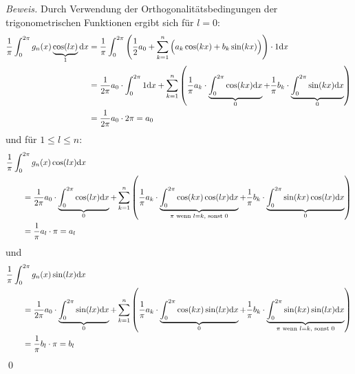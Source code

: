 \textit{Beweis.} Durch Verwendung der Orthogonalitätsbedingungen der trigonometrischen Funktionen
%
ergibt sich für $l=0$:
%
\begin{align*}
  \dfrac{1}{\pi} \int_{0}^{2\pi} g_n(x)\underbrace{\cos(lx)}_{1} \text{d} x 
  &= \dfrac{1}{\pi} \int_{0}^{2\pi} \left(\dfrac{1}{2}a_0 + \sum_{k=1}^{n}\Big(a_k\cos(kx)+b_k\sin(kx)\Big)\right)\cdot 1 \text{d} x \\
  &= \dfrac{1}{2\pi} a_0\cdot \int_{0}^{2\pi} 1 \text{d} x
  + \sum_{k=1}^n \left(
    \dfrac{1}{\pi} a_k \cdot\underbrace{\int_{0}^{2\pi} \cos(kx) \text{d} x}_{0} 
    + \dfrac{1}{\pi} b_k \cdot \underbrace{\int_{0}^{2\pi} \sin(kx)\text{d} x}_{0}
  \right) \\
  &= \dfrac{1}{2\pi} a_0 \cdot 2\pi = a_0
\end{align*}
%
und für $1\leq l \leq n$:
\begin{align*}
  &\dfrac{1}{\pi} \int_{0}^{2\pi} g_n(x)\cos(lx) \text{d} x \\
  &\qquad= \dfrac{1}{2\pi} a_0 \cdot\underbrace{\int_{0}^{2\pi} \cos(lx) \text{d} x}_{0}
  + \sum_{k=1}^n \left(
    \dfrac{1}{\pi}a_k\cdot\underbrace{\int_{0}^{2\pi} \cos(kx)\cos(lx) \text{d} x}_{\pi\text{ wenn } l=k, \text{ sonst } 0}
    + \dfrac{1}{\pi} b_k\cdot\underbrace{\int_{0}^{2\pi} \sin(kx)\cos(lx)\text{d} x}_{0}
  \right) \\
  &\qquad= \dfrac{1}{\pi} a_l \cdot \pi = a_l
\end{align*}
und 
\begin{align*}
  &\dfrac{1}{\pi} \int_{0}^{2\pi} g_n(x)\sin(lx) \text{d} x \\
  &\qquad= \dfrac{1}{2\pi} a_0\cdot \underbrace{\int_{0}^{2\pi} \sin(lx) \text{d} x}_{0}
  + \sum_{k=1}^n \left(
    \dfrac{1}{\pi}a_k\cdot\underbrace{\int_{0}^{2\pi} \cos(kx)\sin(lx) \text{d} x}_{0}
    + \dfrac{1}{\pi} b_k\cdot\underbrace{\int_{0}^{2\pi} \sin(kx)\sin(lx)\text{d} x}_{\pi\text{ wenn } l=k, \text{ sonst } 0}
  \right) \\
  &\qquad= \dfrac{1}{\pi} b_l \cdot \pi = b_l
\end{align*}
\qed
%

